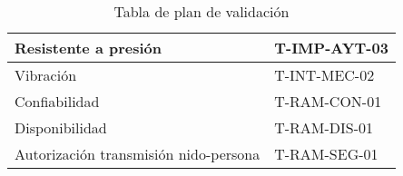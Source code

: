 \begin{table}[H]
\begin{tabular}{|l|l|}
Resistente a presión                                                                                                 & T-IMP-AYT-03                              \\ \hline
Vibración                                                                                                            & T-INT-MEC-02                              \\ \hline
Confiabilidad                                                                                                        & T-RAM-CON-01                              \\ \hline
Disponibilidad                                                                                                       & T-RAM-DIS-01                              \\ \hline
Autorización transmisión nido-persona                                                                                & T-RAM-SEG-01                              \\ \hline
\end{tabular}
\caption{Tabla de plan de validación}
\end{table}